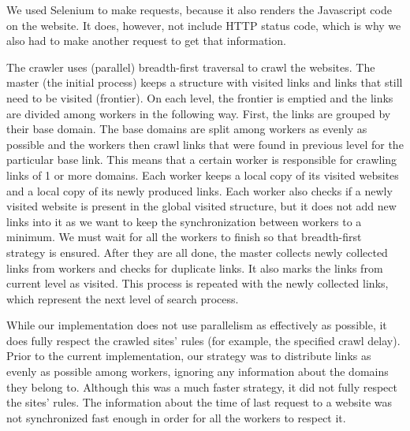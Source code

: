 \documentclass[9pt]{IEEEtran}
\begin{document}
We used Selenium to make requests, because it also renders the Javascript code on the website. It does, however, not include HTTP status code, which is why we also had to make another request to get that information.

The crawler uses (parallel) breadth-first traversal to crawl the websites. The master (the initial process) keeps a structure with visited links and links that still need to be visited (frontier).
On each level, the frontier is emptied and the links are divided among workers in the following way.
First, the links are grouped by their base domain.
The base domains are split among workers as evenly as possible and the workers then crawl links that were found in previous level for the particular base link.
This means that a certain worker is responsible for crawling links of 1 or more domains.
Each worker keeps a local copy of its visited websites and a local copy of its newly produced links.
Each worker also checks if a newly visited website is present in the global visited structure, but it does not add new links into it as we want to keep the synchronization between workers to a minimum.
We must wait for all the workers to finish so that breadth-first strategy is ensured.
After they are all done, the master collects newly collected links from workers and checks for duplicate links.
It also marks the links from current level as visited.
This process is repeated with the newly collected links, which represent the next level of search process.

While our implementation does not use parallelism as effectively as possible, it does fully respect the crawled sites' rules (for example, the specified crawl delay).
Prior to the current implementation, our strategy was to distribute links as evenly as possible among workers, ignoring any information about the domains they belong to.
Although this was a much faster strategy, it did not fully respect the sites' rules.
The information about the time of last request to a website was not synchronized fast enough in order for all the workers to respect it.
\end{document}
